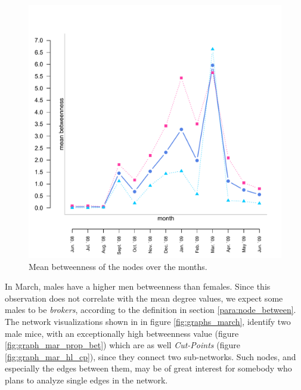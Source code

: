 \begin{figure}[htpb]
\begin{center}
  \includegraphics[width=.6\textwidth]{assets/pdf/long_betweenness.pdf}
  \caption[Mean betweenness of the nodes over the months]{Mean betweenness of the nodes over the months.}
  \label{fig:long_betweenness}
\end{center}
\end{figure}

In March, males have a higher men betweenness than females. Since this observation does not correlate with the mean degree values, we expect some males to be \textit{brokers}, according to the definition in section \ref{para:node_between}. The network visualizations shown in in figure \ref{fig:graphs_march}, identify two male mice, with an exceptionally high betweenness value (figure \ref{fig:graph_mar_prop_bet}) which are as well \textit{Cut-Points} (figure \ref{fig:graph_mar_hl_cp}), since they connect two sub-networks. Such nodes, and especially the edges between them, may be of great interest for somebody who plans to analyze single edges in the network.   

